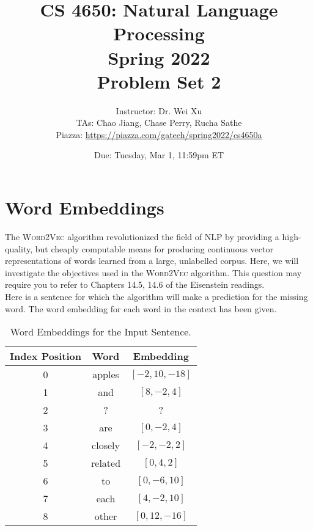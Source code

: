 \documentclass[11pt, letterpaper]{article}
\begin{document}
\title{CS 4650: Natural Language Processing \\ Spring 2022 \\ Problem Set 2}
\author{Instructor: Dr. Wei Xu \\ TAs: Chao Jiang, Chase Perry, Rucha Sathe \\Piazza: \url{https://piazza.com/gatech/spring2022/cs4650a}}
\date{Due: Tuesday, Mar 1, 11:59pm ET}
\maketitle

\section{Word Embeddings}

The \textsc{Word2Vec} algorithm revolutionized the field of NLP by providing a high-quality, but cheaply computable means for producing continuous vector representations of words learned from a large, unlabelled corpus. Here, we will investigate the objectives used in the \textsc{Word2Vec} algorithm. This question may require you to refer to Chapters 14.5, 14.6 of the Eisenstein readings. \\

Here is a sentence for which the algorithm will make a prediction for the missing word. The word embedding for each word in the context has been given.

\begin{table}[h!]
    \centering
    \begin{tabular}{|ccc|}
    \toprule
    \textbf{Index Position} & \textbf{Word} & \textbf{Embedding} \\
    \midrule
    0 & apples & $[-2,10,-18]$ \\
    1 & and & $[8,-2,4]$ \\
    2 & ? & ? \\
    3 & are & $[0,-2,4]$\\
    4 & closely & $[-2,-2,2]$\\
    5 & related & $[0,4,2]$\\
    6 & to & $[0,-6,10]$\\
    7 & each & $[4,-2,10]$\\
    8 & other & $[0,12,-16]$\\
    
    \bottomrule
    \end{tabular}
    \caption{Word Embeddings for the Input Sentence.}
\end{table}
\end{document}

